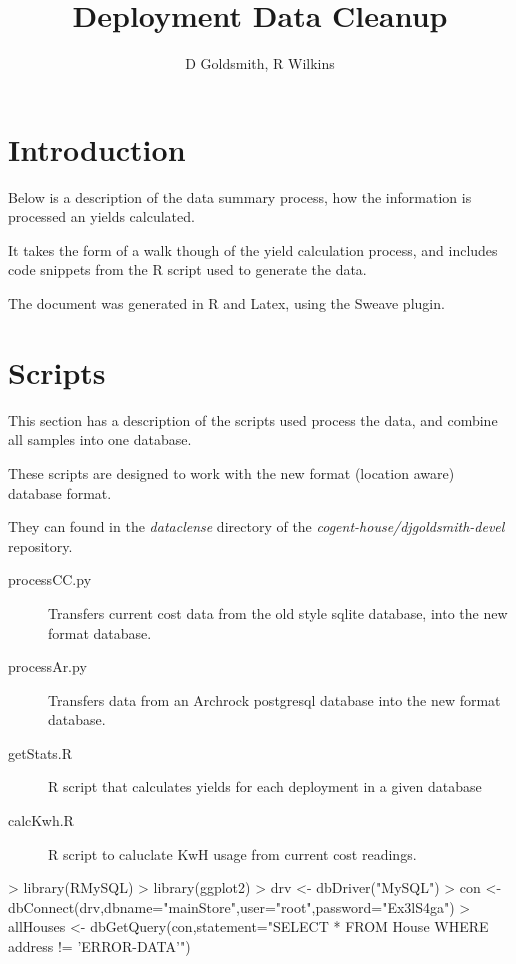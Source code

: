 \documentclass[12pt,a4paper]{article}
\title{Deployment Data Cleanup}
\author{D Goldsmith, R Wilkins}
\begin{document}
\maketitle

\section{Introduction}

Below is a description of the data summary process, how the information is
processed an yields calculated.

It takes the form of a walk though of the yield calculation process, and
includes code snippets from the R script used to generate the data.

The document was generated in R and Latex, using the Sweave plugin.

\section{Scripts}
This section has a description of the scripts used process the data, and combine
all samples into one database.

These scripts are designed to work with the new format (location aware) database format.

They can found in the \emph{dataclense} directory of the \emph{cogent-house/djgoldsmith-devel} repository.

\begin{description}
    \item[processCC.py]  Transfers current cost data from the old style sqlite
      database, into the new format database.
    \item[processAr.py] Transfers data from an Archrock postgresql database into the
      new format database.
    \item[getStats.R] R script that calculates yields for each deployment in a given database
    \item[calcKwh.R] R script to caluclate KwH usage from current cost readings.
\end{description}



\begin{Schunk}
\begin{Sinput}
> library(RMySQL)
> library(ggplot2)
> drv <- dbDriver("MySQL")
> con <- dbConnect(drv,dbname="mainStore",user="root",password="Ex3lS4ga")
> allHouses <-  dbGetQuery(con,statement="SELECT * FROM House WHERE address != 'ERROR-DATA'")
\end{Sinput}
\end{Schunk}
\end{document}
